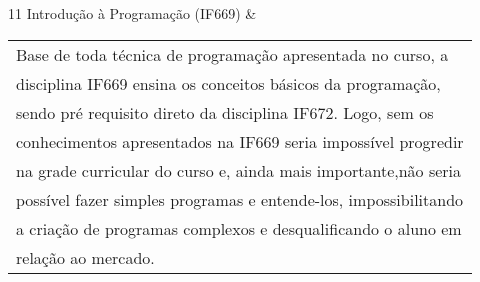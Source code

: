 \documentclass{article}
\begin{document}
\begin{table}[h]
\begin{tabular}{11}
Introdução à Programação (IF669) & \begin{tabular}[c]{@{}l@{}}Base de toda técnica
de programação apresentada no curso, a\\  disciplina IF669 ensina os conceitos
básicos da programação,\\  sendo pré requisito direto da disciplina IF672. Logo,
sem os\\ conhecimentos apresentados na IF669 seria impossível progredir\\  na
grade curricular do curso e, ainda mais importante,não seria\\ possível fazer
simples programas e entende-los, impossibilitando\\ a criação de programas
complexos e desqualificando o aluno em\\  relação ao mercado.\end{tabular}
\end{tabular}
\end{table}




\cite{IanSommerville}
\cite{CarloGhezzi}
\cite{AlainAbran}
\cite{ShariPfleeger}
\end{document}
